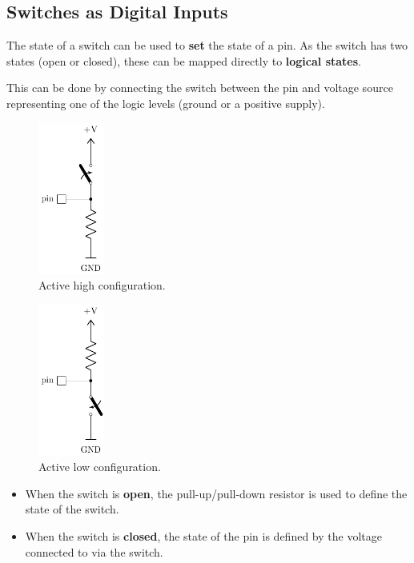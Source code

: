 \documentclass{report}
\begin{document}
\subsection{Switches as Digital Inputs}
The state of a switch can be used to \textbf{set} the state of a pin.
As the switch has two states (open or closed), these can be mapped directly to
\textbf{logical states}.

This can be done by connecting the switch between the pin and voltage source
representing one of the logic levels (ground or a positive supply).
\pagebreak
\begin{multicols}{2}
    \begin{figure}[H]
        \centering
        \includegraphics[height = 5cm, keepaspectratio = true]{figures/active_high_switch.pdf}
        \caption{Active high configuration.} %
    \end{figure}
    \begin{figure}[H]
        \centering
        \includegraphics[height = 5cm, keepaspectratio = true]{figures/active_low_switch.pdf}
        \caption{Active low configuration.} %
    \end{figure}
\end{multicols}
\begin{itemize}
    \item When the switch is \textbf{open}, the pull-up/pull-down resistor is used to define the state of the switch.
    \item When the switch is \textbf{closed}, the state of the pin is defined by the voltage connected to via the switch.
\end{itemize}
\end{document}
